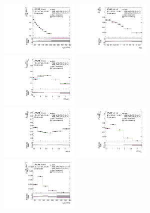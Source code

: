 \begin{figure}[ht]
  \centering
  \includegraphics[width=0.33\textwidth]{figures/diff_xsec/normalized-unfolded-distributions/tty_total_ljet/SL_tty_total_pt_unfolded_normalized.pdf}%
  \includegraphics[width=0.33\textwidth]{figures/diff_xsec/normalized-unfolded-distributions/tty_total_ljet/SL_tty_total_eta_unfolded_normalized.pdf}%
  \includegraphics[width=0.33\textwidth]{figures/diff_xsec/normalized-unfolded-distributions/tty_total_ljet/SL_tty_total_drphb_unfolded_normalized.pdf}\\
  \includegraphics[width=0.33\textwidth]{figures/diff_xsec/normalized-unfolded-distributions/tty_total_ljet/SL_tty_total_drphl_unfolded_normalized.pdf}%
  \includegraphics[width=0.33\textwidth]{figures/diff_xsec/normalized-unfolded-distributions/tty_total_ljet/SL_tty_total_drlj_unfolded_normalized.pdf}%
  \includegraphics[width=0.33\textwidth]{figures/diff_xsec/normalized-unfolded-distributions/tty_total_ljet/SL_tty_total_ptj1_unfolded_normalized.pdf}%

\end{figure}

